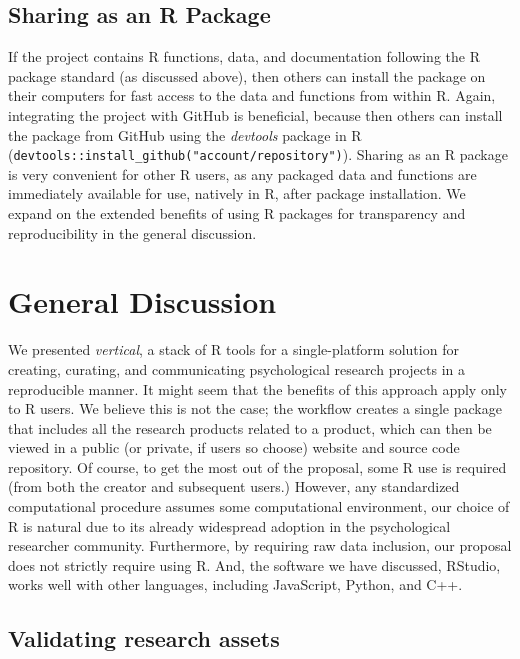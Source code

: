 \documentclass[
  english,
  jou,floatsintext]{apa6}
\begin{document}
\hypertarget{sharing-as-an-r-package}{%
\subsection{Sharing as an R Package}\label{sharing-as-an-r-package}}

If the project contains R functions, data, and documentation following the R package standard (as discussed above), then others can install the package on their computers for fast access to the data and functions from within R. Again, integrating the project with GitHub is beneficial, because then others can install the package from GitHub using the \emph{devtools} package in R (\texttt{devtools::install\_github("account/repository")}). Sharing as an R package is very convenient for other R users, as any packaged data and functions are immediately available for use, natively in R, after package installation. We expand on the extended benefits of using R packages for transparency and reproducibility in the general discussion.

\hypertarget{general-discussion}{%
\section{General Discussion}\label{general-discussion}}

We presented \emph{vertical}, a stack of R tools for a single-platform solution for creating, curating, and communicating psychological research projects in a reproducible manner. It might seem that the benefits of this approach apply only to R users. We believe this is not the case; the workflow creates a single package that includes all the research products related to a product, which can then be viewed in a public (or private, if users so choose) website and source code repository. Of course, to get the most out of the proposal, some R use is required (from both the creator and subsequent users.) However, any standardized computational procedure assumes some computational environment, our choice of R is natural due to its already widespread adoption in the psychological researcher community. Furthermore, by requiring raw data inclusion, our proposal does not strictly require using R. And, the software we have discussed, RStudio, works well with other languages, including JavaScript, Python, and C++.

\hypertarget{validating-research-assets}{%
\subsection{Validating research assets}\label{validating-research-assets}}
\end{document}
